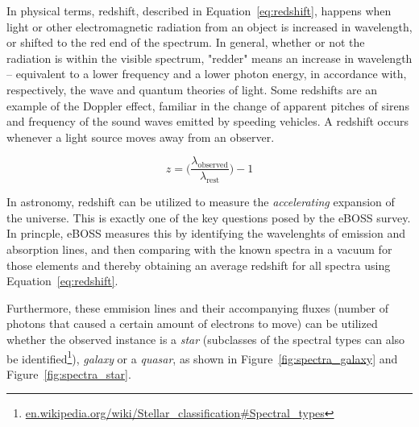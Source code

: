 In physical terms, redshift, described in Equation~\ref{eq:redshift}, happens when light or other electromagnetic radiation from an object is increased in wavelength, or shifted to the red end of the spectrum. In general, whether or not the radiation is within the visible spectrum, "redder" means an increase in wavelength – equivalent to a lower frequency and a lower photon energy, in accordance with, respectively, the wave and quantum theories of light. Some redshifts are an example of the Doppler effect, familiar in the change of apparent pitches of sirens and frequency of the sound waves emitted by speeding vehicles. A redshift occurs whenever a light source moves away from an observer.

\begin{equation}
  z = \Bigg(\frac{\lambda_\text{observed}}{\lambda_\text{rest}}\Bigg) - 1
  \label{eq:redshift}
\end{equation}

In astronomy, redshift can be utilized to measure the \emph{accelerating} expansion of the universe. This is exactly one of the key questions posed by the eBOSS survey. In princple, eBOSS measures this by identifying the wavelenghts of emission and absorption lines, and then comparing with the known spectra in a vacuum for those elements and thereby obtaining an average redshift for all spectra using Equation~\ref{eq:redshift}.

\begin{figure}[H]
  \centering
\end{figure}

Furthermore, these emmision lines and their accompanying fluxes (number of photons that caused a certain amount of electrons to move) can be utilized whether the observed instance is a \emph{star} (subclasses of the spectral types can also be identified\footnote{\href{https://en.wikipedia.org/wiki/Stellar\_classification\#Spectral\_types}{en.wikipedia.org/wiki/Stellar\_classification\#Spectral\_types}}), \emph{galaxy} or a \emph{quasar}, as shown in Figure~\ref{fig:spectra_galaxy} and Figure~\ref{fig:spectra_star}.

